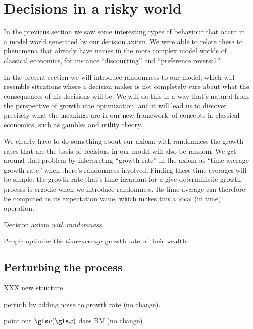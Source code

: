 \chapter{Decisions in a risky world}
In the previous section we saw some interesting types of behaviour that occur in a model world generated by our decision axiom. We were able to relate these to phenomena that already have names in the more complex model worlds of classical economics, for instance ``discounting'' and ``preference reversal.''

In the present section we will introduce randomness to our model, which will resemble situations where a decision maker is not completely sure about what the consequences of his decisions will be. We will do this in a way that's natural from the perspective of growth rate optimization, and it will lead us to discover precisely what the meanings are in our new framework, of concepts in classical economics, such as gambles and utility theory.

We clearly have to do something about our axiom: with randomness the growth rates that are the basis of decisions in our model will also be random. We get around that problem by interpreting ``growth rate'' in the axiom as ``time-average growth rate'' when there's randomness involved. Finding these time averages will be simple: the growth rate that's time-invariant for a give deterministic growth process is ergodic when we introduce randomness. Its time average can therefore be computed as its expectation value, which makes this a local (in time) operation.

\begin{keypts}{Decision axiom {\it with randomness}}

People optimize the {\it time-average} growth rate of their wealth.

\end{keypts}

\section{Perturbing the process }
XXX new structure

perturb by adding noise to growth rate (no change).

point out $\gv(\x)$ does BM (no change)

